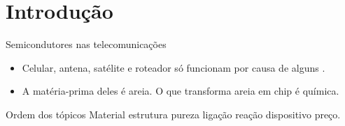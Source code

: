 \section{Introdução}

\begin{frame}{Semicondutores nas telecomunicações}
  \begin{itemize}
    \item Celular, antena, satélite e roteador só funcionam por causa de
          alguns .
    \item A matéria-prima deles é areia. O que transforma areia em chip é
          \alert{química}.
  \end{itemize}
  \vspace{0.4cm}
  \begin{block}{Ordem dos tópicos}
    Material \seta{} estrutura \seta{} pureza \seta{} ligação \seta{} reação
    \seta{} dispositivo \seta{} preço.
  \end{block}
\end{frame}

